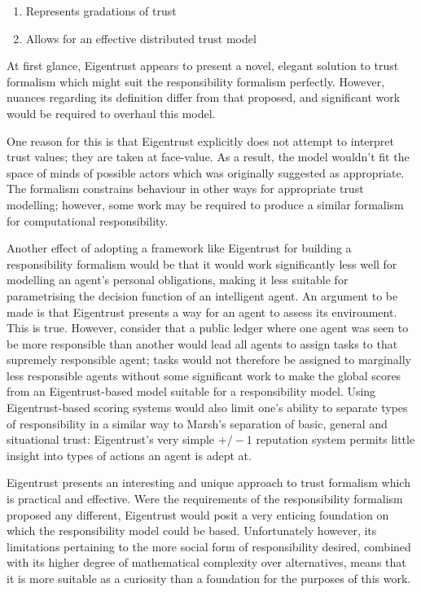 \begin{enumerate}[label=\emph{\Alph*}:]
    \item Represents gradations of trust
    \item Allows for an effective distributed trust model
\end{enumerate}

At first glance, Eigentrust appears to present a novel, elegant solution to trust formalism which might suit the responsibility formalism perfectly. However, nuances regarding its definition differ from that proposed, and significant work would be required to overhaul this model.

One reason for this is that Eigentrust explicitly does not attempt to interpret trust values; they are taken at face-value. As a result, the model wouldn't fit the space of minds of possible actors which was originally suggested as appropriate. The formalism constrains behaviour in other ways for appropriate trust modelling; however, some work may be required to produce a similar formalism for computational responsibility.\par

Another effect of adopting a framework like Eigentrust for building a responsibility formalism would be that it would work significantly less well for modelling an agent's personal obligations, making it less suitable for parametrising the decision function of an intelligent agent. An argument to be made is that Eigentrust presents a way for an agent to assess its environment. This is true. However, consider that a public ledger where one agent was seen to be more responsible than another would lead all agents to assign tasks to that supremely responsible agent; tasks would not therefore be assigned to marginally less responsible agents without some significant work to make the global scores from an Eigentrust-based model suitable for a responsibility model. Using Eigentrust-based scoring systems would also limit one's ability to separate types of responsibility in a similar way to Marsh's separation of basic, general and situational trust: Eigentrust's very simple \(+/-1\) reputation system permits little insight into types of actions an agent is adept at.\par

Eigentrust presents an interesting and unique approach to trust formalism which is practical and effective. Were the requirements of the responsibility formalism proposed any different, Eigentrust would posit a very enticing foundation on which the responsibility model could be based. Unfortunately however, its limitations pertaining to the more social form of responsibility desired, combined with its higher degree of mathematical complexity over alternatives, means that it is more suitable as a curiosity than a foundation for the purposes of this work.\par

